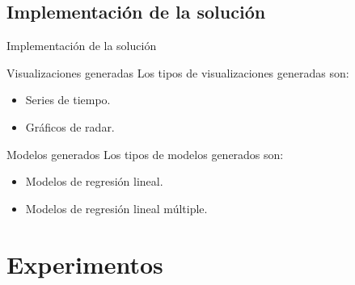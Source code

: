 \documentclass[11pt]{beamer}
\begin{document}
\subsection{Implementación de la solución}
\begin{frame}{Implementación de la solución}
\begin{block}{Visualizaciones generadas} \justifying
Los tipos de visualizaciones generadas son:
\begin{itemize}
	\item Series de tiempo.
	\item Gráficos de radar.
\end{itemize}
\end{block}
\begin{block}{Modelos generados} \justifying
Los tipos de modelos generados son:
\begin{itemize}
	\item Modelos de regresión lineal.
	\item Modelos de regresión lineal múltiple.
\end{itemize}
\end{block}
\end{frame}


\section{Experimentos}
\end{document}
